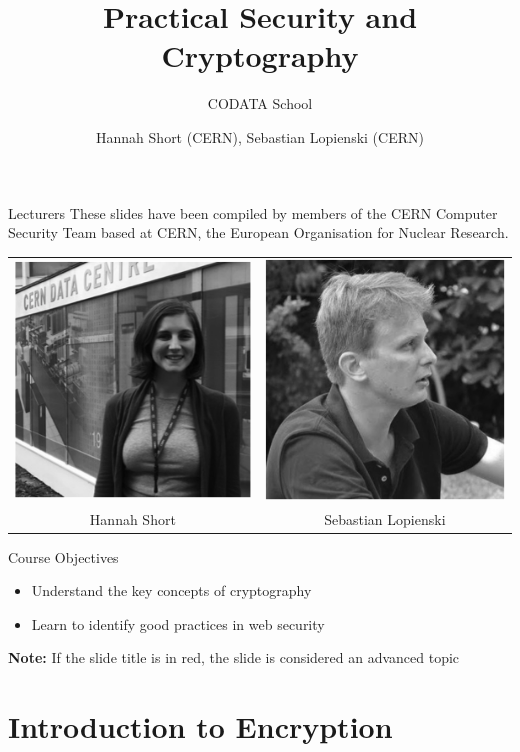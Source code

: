 \documentclass{beamer}
\author{Hannah Short (CERN), Sebastian Lopienski (CERN)}
\title{Practical Security and Cryptography}
\subtitle{CODATA School}
\begin{document}
\frontcover

\frame{\titlepage}

\frame{\tableofcontents}

\begin{frame}{Lecturers}
These slides have been compiled by members of the CERN Computer Security Team based at CERN, the European Organisation for Nuclear Research.
\begin{center}
\begin{tabular}{ c c  }
 \includegraphics[width=0.2\linewidth]{lecturer1.png} & \includegraphics[width=0.2\linewidth]{Lecturer2.png}  \\ 
 Hannah Short & Sebastian Lopienski  \\  
\end{tabular}
\end{center}
\end{frame}

\begin{frame}{Course Objectives}
	\begin{itemize}
		\item Understand the key concepts of cryptography
		\item Learn to identify good practices in web security
	\end{itemize}
\textbf{Note:} \newline
\textit{}{If the slide title is in {\color{red}red}, the slide is considered an advanced topic}
\end{frame}

\section{Introduction to Encryption}
\frame{\sectionpage}
\end{document}
